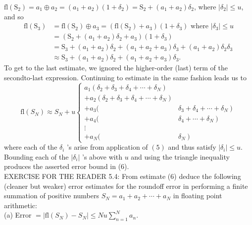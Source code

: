 \documentclass[../main.tex]{subfiles}
\begin{document}
$\mathrm{fl}\left(\mathrm{S}_{2}\right)=a_{1} \oplus a_{2}=\left(a_{1}+a_{2}\right)\left(1+\delta_{2}\right)=\mathrm{S}_{2}+\left(a_{1}+a_{2}\right) \delta_{2}$, where $\left|\delta_{2}\right| \leq u$, and so
$$
\begin{aligned}
\mathrm{fl}\left(\mathrm{S}_{3}\right) &=\mathrm{fl}\left(\mathrm{S}_{2}\right) \oplus a_{3}=\left(\mathrm{fl}\left(\mathrm{S}_{2}\right)+a_{3}\right)\left(1+\delta_{3}\right) \text { where }\left|\delta_{3}\right| \leq u \\
&=\left(\mathrm{S}_{2}+\left(a_{1}+a_{2}\right) \delta_{2}+a_{3}\right)\left(1+\delta_{3}\right) \\
&=\mathrm{S}_{3}+\left(a_{1}+a_{2}\right) \delta_{2}+\left(a_{1}+a_{2}+a_{3}\right) \delta_{3}+\left(a_{1}+a_{2}\right) \delta_{2} \delta_{3} \\
& \approx \mathrm{S}_{3}+\left(a_{1}+a_{2}\right) \delta_{2}+\left(a_{1}+a_{2}+a_{3}\right) \delta_{3} .
\end{aligned}
$$
To get to the last estimate, we ignored the higher-order (last) term of the secondto-last expression. Continuing to estimate in the same fashion leads us to
$$
\mathrm{fl}\left(S_{N}\right) \approx S_{N}+u\left\{\begin{array}{lr}
a_{1}\left(\delta_{2}+\delta_{3}+\delta_{4}+\cdots+\delta_{N}\right) \\
+a_{2}\left(\delta_{2}+\delta_{3}+\delta_{4}+\cdots+\delta_{N}\right) \\
+a_{3}( & \left.\delta_{3}+\delta_{4}+\cdots+\delta_{N}\right) \\
+a_{4}( & \left.\delta_{4}+\cdots+\delta_{N}\right) \\
\vdots \\
+a_{N}( & \left.\delta_{N}\right)
\end{array}\right.
$$
where each of the $\delta_{i}$ 's arise from application of $(5)$ and thus satisfy $\left|\delta_{i}\right| \leq u$. Bounding each of the $\left|\delta_{i}\right|$ 's above with $u$ and using the triangle inequality produces the asserted error bound in (6).\\

EXERCISE FOR THE READER 5.4: From estimate (6) deduce the following (cleaner but weaker) error estimates for the roundoff error in performing a finite summation of positive numbers $S_{N}=a_{1}+a_{2}+\cdots+a_{N}$ in floating point arithmetic:\\

(a) Error $=\left|\mathrm{fl}\left(S_{N}\right)-S_{N}\right| \leq N u \sum_{n=1}^{N} a_{n}$.\\
\end{document}
